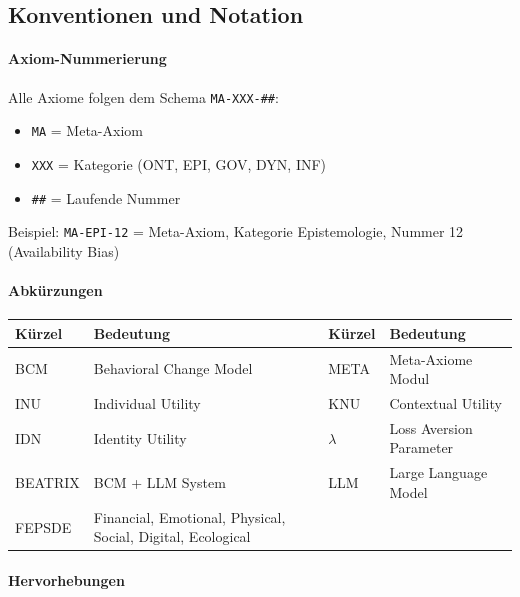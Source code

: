 \subsection*{Konventionen und Notation}

\paragraph{Axiom-Nummerierung}

Alle Axiome folgen dem Schema \texttt{MA-XXX-\#\#}:
\begin{itemize}
    \item \texttt{MA} = Meta-Axiom
    \item \texttt{XXX} = Kategorie (ONT, EPI, GOV, DYN, INF)
    \item \texttt{\#\#} = Laufende Nummer
\end{itemize}
Beispiel: \texttt{MA-EPI-12} = Meta-Axiom, Kategorie Epistemologie, Nummer 12 (Availability Bias)

\paragraph{Abkürzungen}

\begin{table}[h]
\centering
\small
\begin{tabular}{@{}ll|ll@{}}
\toprule
\textbf{Kürzel} & \textbf{Bedeutung} & \textbf{Kürzel} & \textbf{Bedeutung} \\
\midrule
BCM & Behavioral Change Model & META & Meta-Axiome Modul \\
INU & Individual Utility & KNU & Contextual Utility \\
IDN & Identity Utility & $\lambda$ & Loss Aversion Parameter \\
BEATRIX & BCM + LLM System & LLM & Large Language Model \\
FEPSDE & Financial, Emotional, Physical, Social, Digital, Ecological \\
\bottomrule
\end{tabular}
\end{table}

\paragraph{Hervorhebungen}

